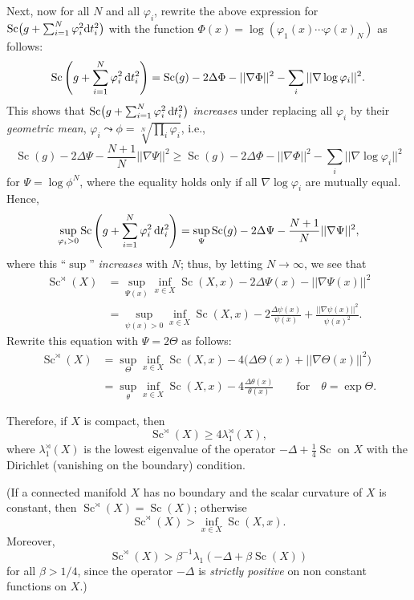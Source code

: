 \documentclass[10pt,a4paper]{amsart}
\numberwithin{equation}{section}
\begin{document}
 Next, now for all $N$ and all $\varphi_i$, rewrite the above expression for $\operatorname{Sc}\bigl(g+\sum_{i=1}^N\varphi_i^2{\rm d}t_i^2\bigr)$
 with the function $\Phi(x)=\log(\varphi_1(x)\cdots \varphi(x)_N)$ as follows:
\[
\operatorname{Sc}\left(g+\sum_{i=1}^N\varphi_i^2\,{\rm d}t_i^2\right)= \operatorname{Sc}(g) -2\Delta\Phi-||\nabla \Phi||^2 -\sum_i{||\nabla\log \varphi_i||^2}.
\]
This shows that
$\operatorname{Sc}\bigl(g+\sum_{i=1}^N\varphi_i^2\,{\rm d}t_i^2\bigr)$ {\it increases} under replacing all $\varphi_i$ by their {\it geometric mean},
$\varphi_i\leadsto \phi= \sqrt[N]{\prod_i\varphi_i}$, i.e.,
\[
\operatorname{Sc}(g)-2\Delta\Psi -\frac {N+1}{N}||\nabla\Psi||^2\geq \operatorname{Sc}(g) -2\Delta\Phi-||\nabla \Phi||^2 -\sum_i||\nabla\log\varphi_i||^2
\]
for $\Psi=\log \phi^N$, where the equality holds only if all $\nabla\log\varphi_i$ are mutually equal.
Hence,
\[
\sup_{\varphi_i>0} \operatorname{Sc}\left(g+\sum_{i=1}^N\varphi_i^2\,{\rm d}t_i^2\right)=\sup_\Psi \operatorname{Sc}(g)-2\Delta\Psi -\frac {N+1}{N}||\nabla\Psi||^2,
\]
where this ``$\sup$'' {\it increases} with $N$; thus,
 by letting $N\to\infty$, we see that
\begin{align*}
\operatorname{Sc}^\rtimes (X)& =\sup_{\Psi(x) }\inf_{x\in X} \operatorname{Sc}(X,x)-2\Delta\Psi(x) -||\nabla\Psi(x)||^2 \\
& = \sup_{\psi(x)>0}\inf_{x\in X} \operatorname{Sc}(X,x)- 2\frac{\Delta\psi(x)} {\psi(x)} +\frac{||\nabla\psi(x)||^2}{\psi(x)^2}.
\end{align*}
Rewrite this equation with $\Psi=2\Theta$ as follows:
\begin{align*}
\operatorname{Sc}^\rtimes (X) & =\sup_{\Theta }\inf_{x\in X} \operatorname{Sc}(X,x)-4\bigl(\Delta\Theta(x) +||\nabla\Theta(x)||^2\bigr)\\
& =
\sup_{\theta }\inf_{x\in X} \operatorname{Sc}(X,x)-4\frac{\Delta\theta(x)} {\theta(x)} \qquad \text{for} \quad \theta=\exp \Theta.
\end{align*}

 Therefore, if $X$ is compact, then
\[
\operatorname{Sc}^\rtimes (X)\geq 4\lambda_1^\rtimes(X),
\]
where $\lambda^\rtimes_1(X)$ is the lowest eigenvalue of the operator
$-\Delta +\frac {1}{4}\operatorname{Sc}$ on $X$ with the Dirichlet (vanishing on the boundary) condition.

(If a connected manifold $X$
has no boundary and the scalar curvature of $X$ is constant,
then $\operatorname{Sc}^\rtimes (X)=\operatorname{Sc}(X)$; otherwise
\[
\operatorname{Sc}^\rtimes (X)> \inf_{x\in X}\operatorname{Sc}(X,x).
\]
 Moreover,
\[
\operatorname{Sc}^\rtimes (X)>\beta^{-1} \lambda_1\left(-\Delta +\beta \operatorname{Sc}(X)\right)
\]
 for all $\beta>1/4$, since the operator $-\Delta$ is
{\it strictly positive} on non constant functions on $X$.)
\end{document}

